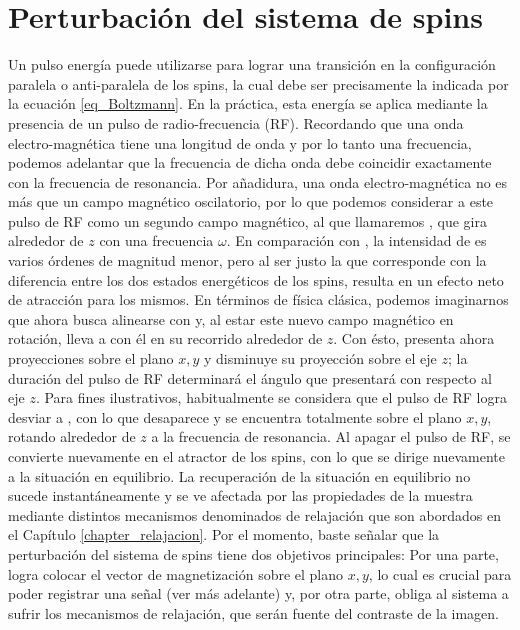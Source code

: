\section{Perturbación del sistema de spins}
Un pulso energía puede utilizarse para lograr una transición en la configuración paralela o anti-paralela de los spins, la cual debe ser precisamente la indicada por la ecuación \ref{eq_Boltzmann}. En la práctica, esta energía se aplica mediante la presencia de un pulso de radio-frecuencia (RF). Recordando que una onda electro-magnética tiene una longitud de onda y por lo tanto una frecuencia, podemos adelantar que la frecuencia de dicha onda debe coincidir exactamente con la frecuencia de resonancia. Por añadidura, una onda electro-magnética no es más que un campo magnético oscilatorio, por lo que podemos considerar a este pulso de RF como un segundo campo magnético, al que llamaremos \Bone, que gira alrededor de $z$ con una frecuencia $\omega$. En comparación con \Bzero, la intensidad de \Bone es varios órdenes de magnitud menor, pero al ser justo la que corresponde con la diferencia entre los dos estados energéticos de los spins, resulta en un efecto neto de atracción para los mismos. En términos de física clásica, podemos imaginarnos que \Mzero ahora busca alinearse con \Bone y, al estar este nuevo campo magnético en rotación, lleva a \Mzero con él en su recorrido alrededor de $z$. Con ésto, \Mzero presenta ahora proyecciones sobre el plano $x,y$ y disminuye su proyección sobre el eje $z$; la duración del pulso de RF determinará el ángulo que \Mzero presentará con respecto al eje $z$. Para fines ilustrativos, habitualmente se considera que el pulso de RF logra desviar a \degrees, con lo que \Mz desaparece y \Mzero se encuentra totalmente sobre el plano $x,y$, rotando alrededor de $z$ a la frecuencia de resonancia. Al apagar el pulso de RF, \Bzero se convierte nuevamente en el atractor de los spins, con lo que \Mzero se dirige nuevamente a la situación en equilibrio. La recuperación de la situación en equilibrio no sucede instantáneamente y se ve afectada por las propiedades de la muestra mediante distintos mecanismos denominados de relajación que son abordados en el Capítulo \ref{chapter_relajacion}. Por el momento, baste señalar que la perturbación del sistema de spins tiene dos objetivos principales: Por una parte, logra colocar el vector de magnetización sobre el plano $x,y$, lo cual es crucial para poder registrar una señal (ver más adelante) y, por otra parte, obliga al sistema a sufrir los mecanismos de relajación, que serán fuente del contraste de la imagen.


